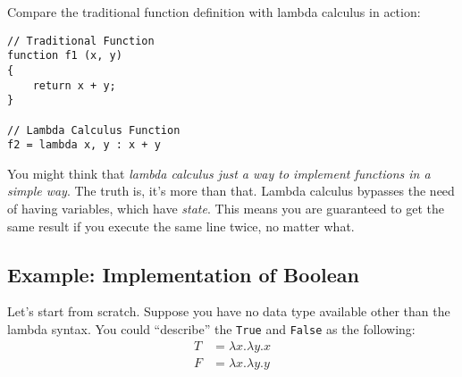 \documentclass[12pt, a4paper]{article}
\theoremstyle{definition}
\begin{document}
Compare the traditional function definition with lambda calculus in action:
\begin{lstlisting}
// Traditional Function
function f1 (x, y)
{
    return x + y;
}

// Lambda Calculus Function
f2 = lambda x, y : x + y
\end{lstlisting}
You might think that \textit{lambda calculus just a way to implement functions in a simple way}.
The truth is, it's more than that.
Lambda calculus bypasses the need of having variables, which have \textit{state}.
This means you are guaranteed to get the same result if you execute the same line twice, no matter what.

\subsection{Example: Implementation of Boolean}
Let's start from scratch.
Suppose you have no data type available other than the lambda syntax.
You could ``describe'' the \lstinline{True} and \lstinline{False} as the following:
\begin{align*}
    T &= \lambda x. \lambda y . x \\
    F &= \lambda x. \lambda y . y
\end{align*}
\end{document}
